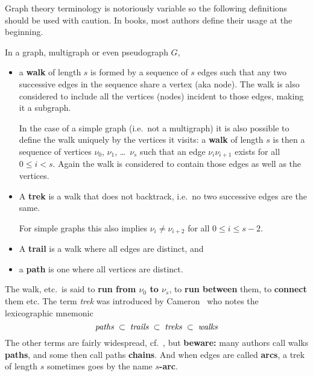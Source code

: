 \documentclass[12pt]{article}
\let\le\leqslant
\begin{document}

Graph theory terminology is notoriously variable so the following definitions should be used with caution. In books, most authors define their usage at the beginning.

In a graph, multigraph or even pseudograph $G$,
%
\begin{itemize}

\item a {\bf walk} of length $s$ is formed by a sequence of $s$ edges such
      that any two successive edges in the sequence share a vertex (aka node).
      The walk is also considered to include all the vertices (nodes) incident
      to those edges, making it a subgraph.

      In the case of a simple graph (i.e.\ not a multigraph) it is also
      possible to define the walk uniquely by the vertices it visits: a
      {\bf walk} of length $s$ is then a sequence of vertices $\nu_0$, 
      $\nu_1$, \dots\ $\nu_s$ such that an edge $\nu_i\nu_{i+1}$ exists
      for all $0\le i\lt s$. Again the walk is considered to contain those
      edges as well as the vertices.

\item A {\bf trek} is a walk that does not backtrack, i.e.\ 
      no two successive edges are the same.

      For simple graphs this also implies
      $\nu_i \ne \nu_{i+2}$ for all $0\le i\le s-2$.

\item A {\bf trail} is a walk where all edges are distinct, and

\item a {\bf path} is one where all vertices are distinct.

\end{itemize}
%
The walk, etc.\ is said to {\bf run from $\nu_0$ to $\nu_s$}, to {\bf run between} them, to {\bf connect} them etc. The term {\em trek\/} was introduced by Cameron~\cite{Cam94} who notes the lexicographic mnemonic
$$
  \hbox{\em paths\/}  \;\subset\;
  \hbox{\em trails\/} \;\subset\;
  \hbox{\em treks\/}  \;\subset\;
  \hbox{\em walks\/}
$$
The other terms are fairly widespread, cf.~\cite{Wil02}, but {\bf beware:} many authors call walks {\bf paths}, and some then call paths {\bf chains}. And when edges are called {\bf arcs}, a trek of length $s$ sometimes goes by the name
{\bf $s$-arc}.
\end{document}
